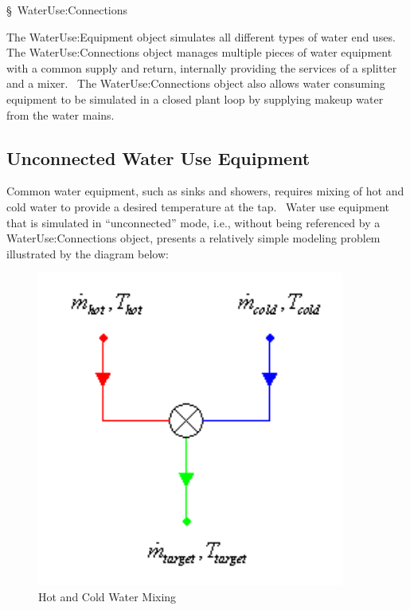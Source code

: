 §~WaterUse:Connections

The WaterUse:Equipment object simulates all different types of water end uses.~ The WaterUse:Connections object manages multiple pieces of water equipment with a common supply and return, internally providing the services of a splitter and a mixer.~ The WaterUse:Connections object also allows water consuming equipment to be simulated in a closed plant loop by supplying makeup water from the water mains.

\subsection{Unconnected Water Use Equipment}\label{unconnected-water-use-equipment}

Common water equipment, such as sinks and showers, requires mixing of hot and cold water to provide a desired temperature at the tap.~ Water use equipment that is simulated in ``unconnected'' mode, i.e., without being referenced by a WaterUse:Connections object, presents a relatively simple modeling problem illustrated by the diagram below:

\begin{figure}[hbtp] %
\centering
\includegraphics[width=0.9\textwidth, height=0.9\textheight, keepaspectratio=true]{media/image6937.png}
\caption{Hot and Cold Water Mixing \protect \label{fig:hot-and-cold-water-mixing}}
\end{figure}

